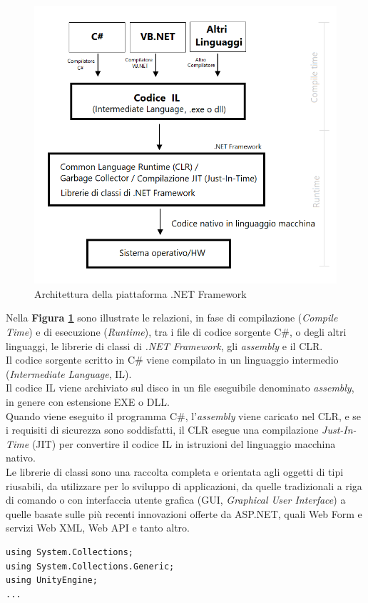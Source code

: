 \begin{figure}[H]
    \centering
    \includegraphics[scale = 0.6]{Immagini/architettura-framework-dotnet.png}
    \caption{Architettura della piattaforma .NET Framework}
    \label{fig:3.9}
\end{figure}
\hspace{-0.6cm}Nella \textbf{Figura \ref{fig:3.9}} sono illustrate le relazioni, in fase di compilazione (\textit{Compile Time}) e di esecuzione (\textit{Runtime}), tra i file di codice sorgente C\#, o degli altri linguaggi, le librerie di classi di \textit{.NET Framework}, gli \textit{assembly} e il CLR.
\\Il codice sorgente scritto in C\# viene compilato in un linguaggio intermedio (\textit{Intermediate Language}, IL). 
\\Il codice IL viene archiviato sul disco in un file eseguibile denominato \textit{assembly}, in genere con estensione EXE o DLL.
\\Quando viene eseguito il programma C\#, l'\textit{assembly} viene caricato nel CLR, e se i requisiti di sicurezza sono soddisfatti, il CLR esegue una compilazione \textit{Just-In-Time} (JIT) per convertire il codice IL in istruzioni del linguaggio macchina nativo.
\\Le librerie di classi sono una raccolta completa e orientata agli oggetti di tipi riusabili, da utilizzare per lo sviluppo di applicazioni, da quelle tradizionali a riga di comando o con interfaccia utente grafica (GUI, \textit{Graphical User Interface}) a quelle basate sulle più recenti innovazioni offerte da ASP.NET, quali Web Form e servizi Web XML, Web API e tanto altro.
\begin{lstlisting}[caption = Esempio di utilizzo di librerie in C\#]
using System.Collections;
using System.Collections.Generic;
using UnityEngine;
...
\end{lstlisting}
